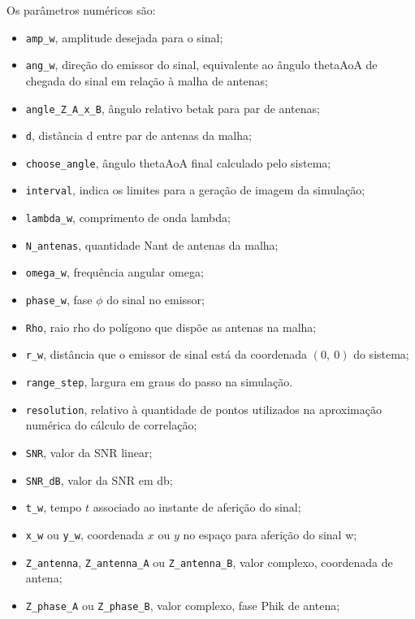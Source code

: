 Os parâmetros numéricos são:
\begin{itemize}
	\item \lstinline|amp_w|, amplitude desejada para o sinal;
	\item \lstinline|ang_w|, direção do emissor do sinal, equivalente ao ângulo \ac{thetaAoA} de chegada do sinal em relação à malha de antenas;
	\item \lstinline|angle_Z_A_x_B|, ângulo relativo \ac{betak} para par de antenas;
	\item \lstinline|d|, distância \ac{d} entre par de antenas da malha;
	\item \lstinline|choose_angle|, ângulo \ac{thetaAoA} final calculado pelo sistema;
	\item \lstinline|interval|, indica os limites para a geração de imagem da simulação;
	\item \lstinline|lambda_w|, comprimento de onda \ac{lambda};
	\item \lstinline|N_antenas|, quantidade \ac{Nant} de antenas da malha;
	\item \lstinline|omega_w|, frequência angular \ac{omega};
	\item \lstinline|phase_w|, fase $\phi$ do sinal no emissor;
	\item \lstinline|Rho|, raio \ac{rho} do polígono que dispõe as antenas na malha;
	\item \lstinline|r_w|, distância que o emissor de sinal está da coordenada $(0,~0)$ do sistema;
	\item \lstinline|range_step|, largura em graus do passo na simulação.
	\item \lstinline|resolution|, relativo à quantidade de pontos utilizados na aproximação numérica do cálculo de correlação;
	\item \lstinline|SNR|, valor da \ac{SNR} linear;
	\item \lstinline|SNR_dB|, valor da \ac{SNR} em \si{\decibel};
	\item \lstinline|t_w|, tempo $t$ associado ao instante de aferição do sinal;
	\item \lstinline|x_w| ou \lstinline|y_w|, coordenada $x$ ou $y$ no espaço para aferição do sinal \ac{w};
	\item \lstinline|Z_antenna|, \lstinline|Z_antenna_A| ou \lstinline|Z_antenna_B|, valor complexo, coordenada de antena;
	\item \lstinline|Z_phase_A| ou \lstinline|Z_phase_B|, valor complexo, fase \ac{Phik} de antena;
\end{itemize}

